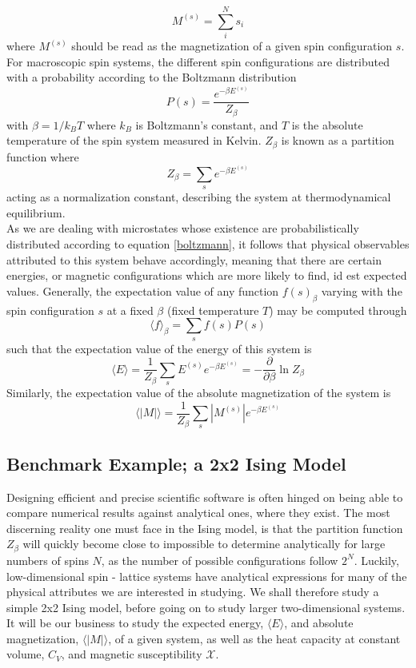 \begin{equation}
    M^{(s)} = \sum_{i}^{N}s_i
    \label{magnetization}
\end{equation}
where $M^{(s)}$ should be read as the magnetization of a given spin configuration $s$. For macroscopic spin systems, the different spin configurations are distributed with a probability according to the Boltzmann distribution
\begin{equation}
    P(s) = \frac{e^{-\beta E^{(s)}}}{Z_\beta}
    \label{boltzmann}
\end{equation}
with $\beta = 1/k_B T $ where $k_B$ is Boltzmann's constant, and $T$ is the absolute temperature of the spin system measured in Kelvin. $Z_\beta$ is known as a partition function where 
\begin{equation}
    Z_\beta = \sum_s e^{-\beta E^{(s)}}
    \label{partitionfunc}
\end{equation}
acting as a normalization constant, describing the system at thermodynamical equilibrium.\\

As we are dealing with microstates whose existence are probabilistically distributed according to equation \eqref{boltzmann}, it follows that physical observables attributed to this system behave accordingly, meaning that there are certain energies, or magnetic configurations which are more likely to find, id est expected values. Generally, the expectation value of any function $f(s)_\beta$ varying with the spin configuration $s$ at a fixed $\beta$ (fixed temperature $T$) may be computed through
\begin{equation}
    \langle f \rangle_\beta = \sum_{s}f(s)P(s)
\end{equation}
such that the expectation value of the energy of this system is
\[
\langle E \rangle = \frac{1}{Z_\beta}\sum_{s}E^{(s)}e^{-\beta E^{(s)}} = -\frac{\partial}{\partial \beta}\ln Z_\beta
\]
Similarly, the expectation value of the absolute magnetization of the system is
\[
\langle |M| \rangle = \frac{1}{Z_\beta}\sum_{s}|M^{(s)}|e^{-\beta E^{(s)}}
\]


\subsection{Benchmark Example; a 2x2 Ising Model}
Designing efficient and precise scientific software is often hinged on being able to compare numerical results against analytical ones, where they exist. The most discerning reality one must face in the Ising model, is that the partition function $Z_\beta$ will quickly become close to impossible to determine analytically for large numbers of spins $N$, as the number of possible configurations follow $2^N$. Luckily, low-dimensional spin - lattice systems have analytical expressions for many of the physical attributes we are interested in studying. We shall therefore study a simple 2x2 Ising model, before going on to study larger two-dimensional systems. It will be our business to study the expected energy, $\langle E \rangle$, and absolute magnetization, $\langle |M| \rangle$, of a given system, as well as the heat capacity at constant volume, $C_V$, and magnetic susceptibility $\mathcal{X}$.\\

